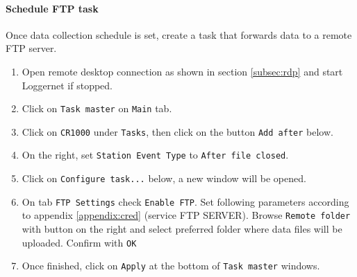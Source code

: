 \paragraph{Schedule FTP task}
Once data collection schedule is set, create a task that forwards data to a remote FTP server.
\begin{enumerate}
	\item Open remote desktop connection as shown in section \ref{subsec:rdp} and start Loggernet if stopped.
	\item Click on {\tt Task master} on {\tt Main} tab.
	\item Click on {\tt CR1000} under {\tt Tasks}, then click on the button {\tt Add after} below.
	\item On the right, set {\tt Station Event Type} to {\tt After file closed}.
	\item Click on {\tt Configure task...} below, a new window will be opened.
	\item On tab {\tt FTP Settings} check {\tt Enable FTP}. Set following parameters according to appendix \ref{appendix:cred} (service FTP SERVER). Browse {\tt Remote folder} with button on the right and select preferred folder where data files will be uploaded. Confirm with {\tt OK}
	\item Once finished, click on {\tt Apply} at the bottom of {\tt Task master} windows.
\end{enumerate}
